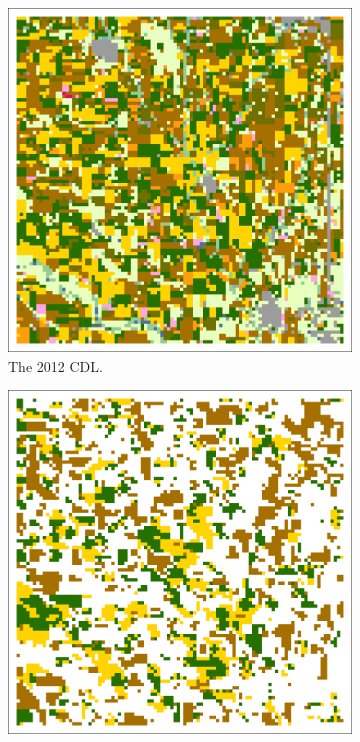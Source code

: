 \begin{figure}
  \centering
  \begin{subfigure}[b]{.45\textwidth}
    \includegraphics[width=\textwidth]{Graphics/Testing/clip1_MODIS_CDL.pdf}
    \caption{The 2012 CDL.}
    \label{subfig:ss1r1CDL}
  \end{subfigure}
  \quad
  \begin{subfigure}[b]{.45\textwidth}
    \includegraphics[width=\textwidth]{Graphics/Testing/clip1_MODIS_round1.pdf}

\end{subfigure}
\end{figure}
